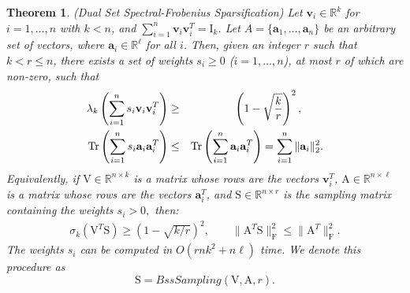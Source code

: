 \documentclass[11pt]{article}
\newcommand{\FNormS}[1]{\mbox{}\|#1\|_\mathrm{F}^2}
\newtheorem{theorem}{Theorem}
\newcommand{\trace}{\text{\rm Tr}}
\newcommand{\mat}[1]{{\ensuremath{\bm{\mathrm{#1}}}}}
\def\ve{{\mathbf v}}
\def\matA{\mat{A}}
\def\matI{\mat{I}}
\def\matS{\mat{S}}
\def\matV{\mat{V}}
\def\frac#1#2{{#1\over #2}}
\def\eqan#1{\begin{eqnarray*}
#1
\end{eqnarray*}}
\def\a{{\mathbf a}}
\begin{document}
\begin{theorem}(Dual Set Spectral-Frobenius Sparsification)
\label{thm:dualset}
Let $\ve_i \in \mathbb{R}^{k}$ for $i = 1, \ldots, n$ with $k < n$, and
$\sum_{i=1}^n \ve_i \ve_i^T = \matI_{k}$. Let $A=\{\a_1,\ldots,\a_n\}$ be an arbitrary set
of vectors, where $\a_i\in \mathbb{R}^{\ell}$ for all $i$. Then,
given an integer $r$ such that $k < r \le n$, 
there exists a set of weights $s_i\ge 0$ ($i=1, \ldots, n$), 
at most $r$ of which are non-zero, such that
\eqan{
\lambda_{k}\left(\sum_{i=1}^n s_i \ve_i \ve_i^T\right)
&\ge&
\left(1 - \sqrt{\frac{k}{r}}\right)^2,
\qquad \\
\trace\left(\sum_{i=1}^n s_i \a_i\a_i^T\right)
&\le&
\trace\left(\sum_{i=1}^n \a_i \a_i^T\right)
=
\sum_{i=1}^n \| \a_i\|_2^2.
}
Equivalently,
if $\matV \in \mathbb{R}^{n \times k}$ is a matrix whose rows are the vectors $\ve_i^T$,
$\matA \in \mathbb{R}^{n \times \ell}$ is a matrix whose rows are the vectors $\a_i^T$, and
$\matS \in \mathbb{R}^{n \times r}$ is the sampling matrix containing the weights $s_i > 0, $ then:
\eqan{
\sigma_{k}\left(\matV^T \matS\right)
\ge
(1 - \sqrt{{k}/{r}})^2,
\qquad
\FNormS{\matA^T \matS}
\le \FNormS{\matA^T}.
}
The weights $s_i$ can be computed in $O\left(rnk^2+n\ell\right)$ time. We denote this procedure as
$$\matS = BssSampling(\matV, \matA, r).$$
\end{theorem} 
\end{document}
